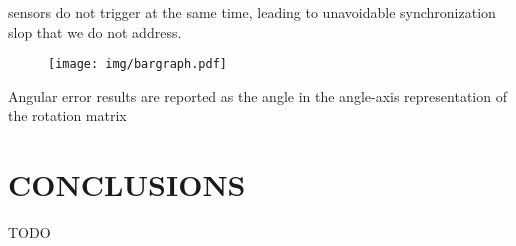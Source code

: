 \documentclass[letterpaper, 10 pt, conference]{ieeeconf}  %
\begin{document}
sensors do not trigger at the same time, leading to unavoidable synchronization slop that we do not address.



\begin{figure}
  \centering
  \texttt{[image: img/bargraph.pdf]}
  \caption{}
  \label{fig:}
\end{figure}



Angular error results are reported as the angle in the angle-axis representation of the rotation matrix 

\section{CONCLUSIONS}
TODO

%
%
\end{document}
